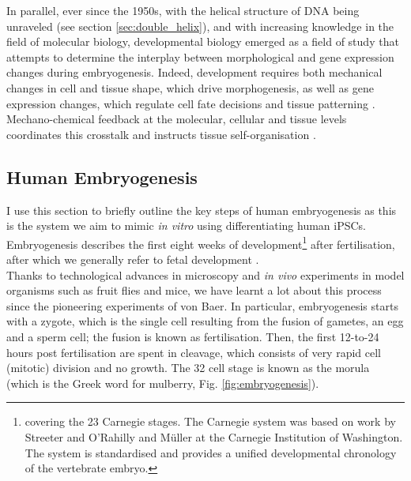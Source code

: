 In parallel, ever since the 1950s, with the helical structure of DNA being unraveled (see section \ref{sec:double_helix}), and with increasing knowledge in the field of molecular biology, developmental biology emerged as a field of study
that attempts to determine the interplay between morphological and gene expression changes during embryogenesis.
Indeed, development requires both mechanical changes in cell and tissue shape, which drive morphogenesis, as well as gene expression changes, which regulate cell fate decisions and tissue patterning \cite{niakan2013analysis, petropoulos2016single}. 
Mechano-chemical feedback at the molecular, cellular and tissue levels coordinates this crosstalk and instructs tissue self-organisation \cite{hannezo2019mechanochemical}.

\newpage

\subsection{Human Embryogenesis}
\label{sec:human_embryogenesis}


I use this section to briefly outline the key steps of human embryogenesis as this is the system we aim to mimic \textit{in vitro} using differentiating human iPSCs.
Embryogenesis describes the first eight weeks of development\footnote{covering the 23 Carnegie stages.
The Carnegie system was based on work by Streeter \cite{streeter1942developmental} and O'Rahilly and Müller \cite{o1973developmental, o2010developmental} at the Carnegie Institution of Washington.
The system is standardised and provides a unified developmental chronology of the vertebrate embryo.} after fertilisation, after which we generally refer to fetal development \cite{gilbert2008developmental}.\\

Thanks to technological advances in microscopy and \textit{in vivo} experiments in model organisms such as fruit flies and mice, we have learnt a lot about this process since the pioneering experiments of von Baer.
In particular, embryogenesis starts with a zygote, which is the single cell resulting from the fusion of gametes, an egg and a sperm cell; the fusion is known as fertilisation.
Then, the first 12-to-24 hours post fertilisation are spent in cleavage, which consists of very rapid cell (mitotic) division and no growth.
The 32 cell stage is known as the morula (which is the Greek word for mulberry, Fig. \ref{fig:embryogenesis}).\\

